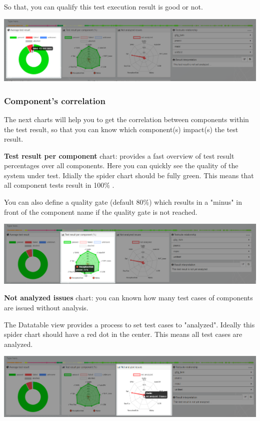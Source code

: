 So that, you can qualify this test execution result is good or not.

\includegraphics[width=1\linewidth]
{./pictures/dashboard/chart_average_test_result.png}

\subsubsection{Component's correlation}
The next charts will help you to get the correlation between components within
the test result, so that you can know which component(s) impact(s) the test
result.

\textbf{Test result per component} chart: provides a fast overview of 
test result percentages over all components. Here you can quickly see
the quality of the system under test. Idially the spider chart should
be fully green. This means that all component tests result in 100\% .

You can also define a quality gate (default 80\%) which results in a "minus"
in front of the component name if the quality gate is not reached.


\includegraphics[width=1\linewidth]
{./pictures/dashboard/chart_test_result_per_component.png}


\textbf{Not analyzed issues} chart: you can known how many test cases of 
components are issued without analysis. 

The Datatable view provides a process to set  test cases to
"analyzed". Ideally this spider chart should have a red dot in the center.
This means all  test cases are analyzed.

\includegraphics[width=1\linewidth]
{./pictures/dashboard/chart_not_analyzed_issues.png}

